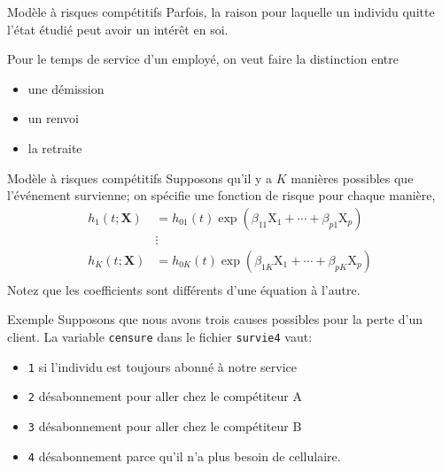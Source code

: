 \documentclass[
  ignorenonframetext,
]{beamer}
\providecommand{\tightlist}{%
  \setlength{\itemsep}{0pt}\setlength{\parskip}{0pt}}\usepackage{longtable,booktabs,array}
\begin{document}
\begin{frame}{Modèle à risques compétitifs}
\protect\hypertarget{moduxe8le-uxe0-risques-compuxe9titifs}{}
Parfois, la raison pour laquelle un individu quitte l'état étudié peut
avoir un intérêt en soi.

Pour le temps de service d'un employé, on veut faire la distinction
entre

\begin{itemize}
\tightlist
\item
  une démission
\item
  un renvoi
\item
  la retraite
\end{itemize}
\end{frame}

\begin{frame}{Modèle à risques compétitifs}
\protect\hypertarget{moduxe8le-uxe0-risques-compuxe9titifs-1}{}
Supposons qu'il y a \(K\) manières possibles que l'événement survienne;
on spécifie une fonction de risque pour chaque manière, \begin{align*}
h_1(t; \mathbf{X})&= h_{01}(t) \exp(\beta_{11}\mathrm{X}_1 + \cdots + \beta_{p1} \mathrm{X}_p)\\
&\vdots\\
h_K(t; \mathbf{X})&= h_{0K}(t) \exp(\beta_{1K}\mathrm{X}_1 + \cdots + \beta_{pK} \mathrm{X}_p)\\
\end{align*} Notez que les coefficients sont différents d'une équation à
l'autre.
\end{frame}

\begin{frame}[fragile]{Exemple}
\protect\hypertarget{exemple-1}{}
Supposons que nous avons trois causes possibles pour la perte d'un
client. La variable \texttt{censure} dans le fichier \texttt{survie4}
vaut:

\begin{itemize}
\tightlist
\item
  \texttt{1} si l'individu est toujours abonné à notre service
\item
  \texttt{2} désabonnement pour aller chez le compétiteur A
\item
  \texttt{3} désabonnement pour aller chez le compétiteur B
\item
  \texttt{4} désabonnement parce qu'il n'a plus besoin de cellulaire.
\end{itemize}
\end{frame}
\end{document}
